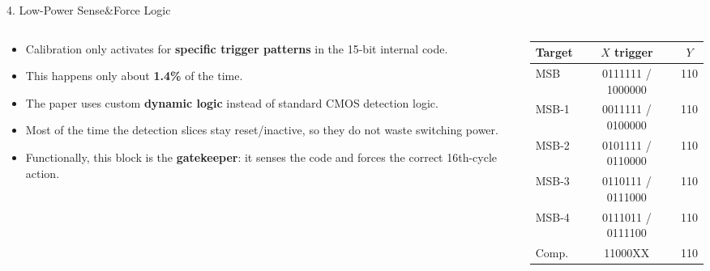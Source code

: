 \documentclass[aspectratio=169]{beamer}
\begin{document}
\begin{frame}{4. Low-Power Sense\&Force Logic}
  \begin{columns}[T]
    \begin{column}{0.54\textwidth}
      \small
      \begin{itemize}
        \item Calibration only activates for \textbf{specific trigger patterns} in the 15-bit internal code.
        \item This happens only about \textbf{1.4\%} of the time.
        \item The paper uses custom \textbf{dynamic logic} instead of standard CMOS detection logic.
        \item Most of the time the detection slices stay reset/inactive, so they do not waste switching power.
        \item Functionally, this block is the \textbf{gatekeeper}: it senses the code and forces the correct 16th-cycle action.
      \end{itemize}
    \end{column}
    \begin{column}{0.46\textwidth}
      \centering
      \scriptsize
      \begin{tabular}{|l|c|c|}
        \hline
        Target & \(X\) trigger & \(Y\) \\
        \hline
        MSB   & 0111111 / 1000000 & 110 \\
        MSB-1 & 0011111 / 0100000 & 110 \\
        MSB-2 & 0101111 / 0110000 & 110 \\
        MSB-3 & 0110111 / 0111000 & 110 \\
        MSB-4 & 0111011 / 0111100 & 110 \\
        Comp. & 11000XX & 110 \\
        \hline
      \end{tabular}

      \vspace{4mm}

    \end{column}
  \end{columns}
\end{frame}
\end{document}
